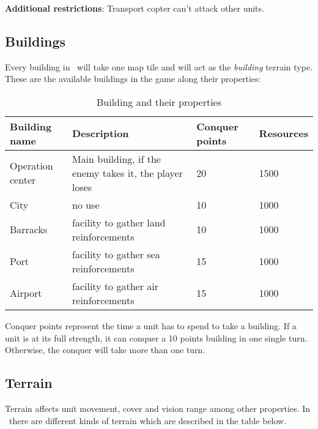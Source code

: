 \textbf{Additional restrictions}: Transport copter can't attack other units.\\

\subsection{Buildings}


Every building in \game\ will take one map tile and will act as the
\textit{building} terrain type. These are the available buildings in
the game along their properties:

\begin{table}[H]
    \label{tab:buildings}
    \begin{center}
    \begin{tabular}{| l | m{7cm}| m{3cm} | m{2.5cm} |}
        \hline
        \textbf{Building name} & \textbf{Description} & \textbf{Conquer points} & \textbf{Resources} \\
        \hline
        Operation center & Main building, if the enemy takes it, the player loses & 20 & 1500\\
        \hline
        City & no use & 10 & 1000 \\
        \hline
        Barracks & facility to gather land reinforcements & 10 & 1000 \\
        \hline
        Port & facility to gather sea reinforcements & 15 & 1000 \\
        \hline
        Airport & facility to gather air reinforcements & 15 & 1000 \\
        \hline
    \end{tabular}
    \end{center}
\caption{Building and their properties}
\end{table}

Conquer points represent the time a unit has to spend to take a building. If a
unit is at its full strength, it can conquer a 10 points building in one single
turn. Otherwise, the conquer will take more than one turn.\\

\subsection{Terrain}


Terrain affects unit movement, cover and vision range among other properties.
In \game\ there are different kinds of terrain which are described in the table
below.\\

